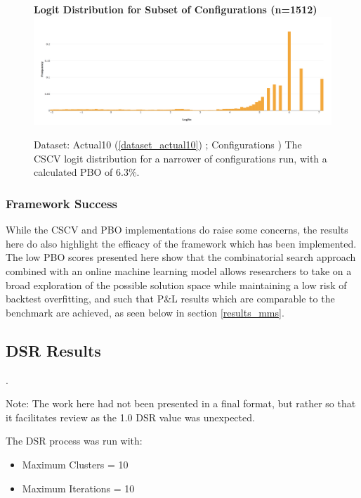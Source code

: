 \documentclass[a4paper,11pt,oneside]{article}
\theoremstyle{plain}
\theoremstyle{definition}
\begin{document}
\begin{figure}[H]
	\centering 
	\textbf{Logit Distribution for Subset of Configurations (n=1512)}
	\includegraphics[scale=0.25]{images/results/pbo/subset_dist.png} 
	\caption[Logit Distribution for Subset of Configurations]{Dataset: Actual10 (\ref{dataset_actual10}) ; Configurations )
		\newline The CSCV logit distribution for a narrower of configurations run, with a calculated PBO of 6.3\%.}
	\label{figure-results_logits_subset}
\end{figure}


\subsubsection{Framework Success}


While the CSCV and PBO implementations do raise some concerns, the results here do also highlight the efficacy of the framework which has been implemented. The low PBO scores presented here show that the combinatorial search approach combined with an online machine learning model allows researchers to take on a broad exploration of the possible solution space while maintaining a low risk of backtest overfitting, and such that P\&L results which are comparable to the benchmark are achieved, as seen below in section \ref{results_mms}.



\newpage

\subsection{DSR Results}\label{results_dsr}.


Note: The work here had not been presented in a final format, but rather so that it facilitates review as the 1.0 DSR value was unexpected. \newline

The DSR process was run with:
\begin{itemize}
	\item Maximum Clusters = 10
	\item Maximum Iterations = 10
\end{itemize}
\end{document}
